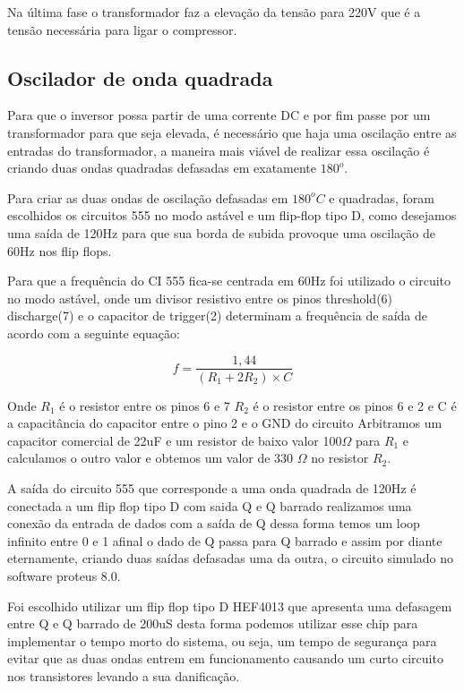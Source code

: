 Na última fase o transformador faz a elevação da tensão para 220V que é a tensão necessária para ligar o compressor.

\subsection{Oscilador de onda quadrada}
Para que o inversor possa partir de uma corrente DC e por fim passe por um transformador para que seja elevada, é necessário que haja uma oscilação entre as entradas do transformador, a maneira mais viável de realizar essa oscilação é criando duas ondas quadradas defasadas em exatamente $180^o$.

Para criar as duas ondas de oscilação defasadas em $180^oC$ e quadradas, foram escolhidos os circuitos 555 no modo astável e um flip-flop tipo D, como desejamos uma saída de 120Hz para que sua borda de subida provoque uma oscilação de 60Hz nos flip flops.

Para que a frequência do CI 555 fica-se centrada em 60Hz foi utilizado o circuito no modo astável, onde um divisor resistivo entre os pinos threshold(6) discharge(7) e o capacitor de trigger(2) determinam a frequência de saída de acordo com a seguinte equação:

$$
f = \frac{1,44}{(R_1+2R_2)\times C}
$$

Onde $R_1$ é o resistor entre os pinos 6 e 7 $R_2$ é o resistor entre os pinos 6 e 2 e C é a capacitância do capacitor entre o pino 2 e o GND do circuito Arbitramos um capacitor comercial de 22uF e um resistor de baixo valor 100$\Omega$ para $R_1$ e calculamos o outro valor e obtemos um valor de 330 $\Omega$ no resistor $R_2$.

A saída do circuito 555 que corresponde a uma onda quadrada de 120Hz é conectada a um flip flop tipo D com saida Q e Q  barrado realizamos uma conexão da entrada de dados com a saída de Q dessa forma temos um loop infinito entre 0 e 1 afinal o dado de Q passa para Q barrado e assim por diante eternamente, criando duas saídas defasadas uma da outra, o circuito simulado no software proteus 8.0.

Foi escolhido utilizar um flip flop tipo D HEF4013 que apresenta uma defasagem entre Q e Q barrado de 200uS desta forma podemos utilizar esse chip para implementar o tempo morto do sistema, ou seja, um tempo de segurança para evitar que as duas ondas entrem em funcionamento causando um curto circuito nos transistores levando a sua danificação.

